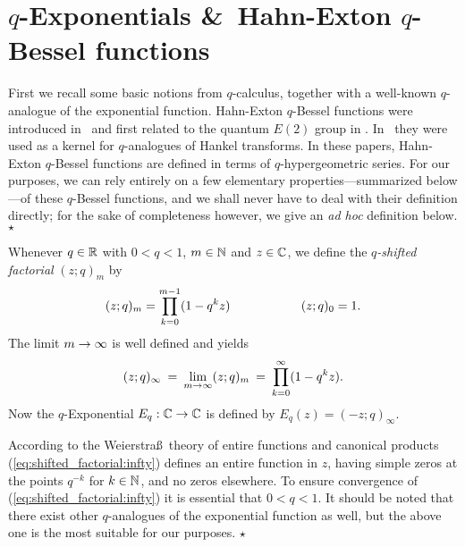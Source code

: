 

\section{$q$-Exponentials \&\ Hahn-Exton $q$-Bessel functions}
\label{sec:qExp_and_qBessel}
\begin{abs} \rm
First we recall some basic notions from $q$-calculus, together with a
well-known $q$-analogue of the exponential function.
Hahn-Exton $q$-Bessel functions were introduced in
\cite{KoornwSwartt,Swarttouw,VaksKor:QE2}\ and first related to the
quantum $E(2)$ group in \cite{Koelink:QE2}\@. In
\cite{KoornwSwartt}\ they were used as a kernel for $q$-analogues
of Hankel transforms. In these papers, Hahn-Exton $q$-Bessel
functions are defined in terms of $q$-hypergeometric series. For
our purposes, we can rely entirely on a few elementary
properties---summarized below---of these $q$-Bessel functions, and
we shall never have to deal with their definition directly; for
the sake of completeness however, we give an {\em ad hoc\/}
definition below.
\hfill $\star$
\end{abs}


\begin{defn} \label{def:shifted_factorial:qExp}
Whenever $q\in\mathbb{R}$ with $0<q<1$, $m\in \mathbb{N}$ and $z\in \mathbb{C}$,
we define the {\em $q$-shifted factorial\/} $(z;q)_m$ by
$$ (z;q)_m = \prod_{k=0}^{m-1} (1-q^k z) \hspace{20mm} (z;q)_0 =1.  $$
The limit $m\rightarrow \infty$ is well defined and yields
\begin{equation}\label{eq:shifted_factorial:infty}
(z;q)_\infty \: = \:\lim_{m\rightarrow \infty} (z;q)_m \:= \:\prod_{k=0}^{\infty} (1-q^k z).
\end{equation}
Now the $q$-Exponential $E_q : \mathbb{C} \rightarrow \mathbb{C}$ is defined by
$E_q(z)=(-z;q)_\infty$.
\end{defn}

\begin{remark} \rm
According to the Weierstra\ss\ theory of entire functions and canonical
products (\ref{eq:shifted_factorial:infty})
defines an entire function in $z$, having simple zeros at the
points $q^{-k}$ for $k\in \mathbb{N}$, and no zeros elsewhere.
To ensure convergence of (\ref{eq:shifted_factorial:infty}) it is
essential that $0<q<1$. It should be noted that there exist
other $q$-analogues of the exponential function as well, but the
above one is the most suitable for our purposes.
\hfill $\star$
\end{remark}

